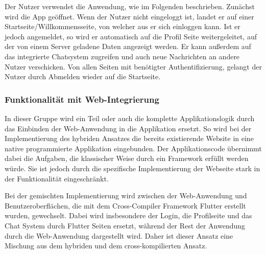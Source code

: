 Der Nutzer verwendet die Anwendung, wie im Folgenden beschrieben. Zunächst wird die App geöffnet. Wenn der Nutzer nicht eingeloggt ist, landet er auf einer Startseite/Willkommensseite, von welcher aus er sich einloggen kann. Ist er jedoch angemeldet, so wird er automatisch auf die Profil Seite weitergeleitet, auf der von einem Server geladene Daten angezeigt werden. Er kann außerdem auf das integrierte Chatsystem zugreifen und auch neue Nachrichten an andere Nutzer verschicken. Von allen Seiten mit benötigter Authentifizierung, gelangt der Nutzer durch Abmelden wieder auf die Startseite.

\subsubsection{Funktionalität mit Web-Integrierung}
In dieser Gruppe wird ein Teil oder auch die komplette Applikationslogik durch das Einbinden der Web-Anwendung in die Applikation ersetzt. So wird bei der Implementierung des hybriden Ansatzes die bereits existierende Website in eine native programmierte Applikation eingebunden. Der Applikationscode übernimmt dabei die Aufgaben, die klassischer Weise durch ein Framework erfüllt werden würde. Sie ist jedoch durch die spezifische Implementierung der Webseite stark in der Funktionalität eingeschränkt.

Bei der gemischten   Implementierung wird zwischen der Web-Anwendung und Benutzeroberflächen, die mit dem Cross-Compiler Framework Flutter erstellt wurden, gewechselt. Dabei wird insbesondere der Login, die Profilseite und das Chat System durch Flutter Seiten ersetzt, während der Rest der Anwendung durch die Web-Anwendung dargestellt wird. Daher ist dieser Ansatz eine Mischung aus dem hybriden und dem cross-kompilierten Ansatz.


